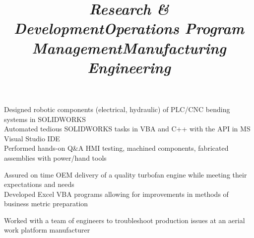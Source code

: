 \documentclass[mm]{res}
\newcommand{\tb}{\textbullet \xspace}
\begin{document}
\begin{resume}
\title{\textsl{Research \& Development}}
\begin{position}
\tb Designed robotic components (electrical, hydraulic) of PLC/CNC bending systems in SOLIDWORKS \\
\tb Automated tedious SOLIDWORKS tasks in VBA and C++ with the API in MS Visual Studio IDE \\
\tb Performed hands-on Q\&A HMI testing, machined components, fabricated assemblies with power/hand tools
\end{position}

\title{\textsl{Operations Program Management}}
\begin{position}
\tb Assured on time OEM delivery of a quality turbofan engine while meeting their expectations and needs \\
\tb Developed Excel VBA programs allowing for improvements in methods of business metric preparation
\end{position}

\title{\textsl{Manufacturing Engineering}}
\begin{position}
\tb Worked with a team of engineers to troubleshoot production issues at an aerial work platform manufacturer
\end{position}



\end{resume}
\end{document}
